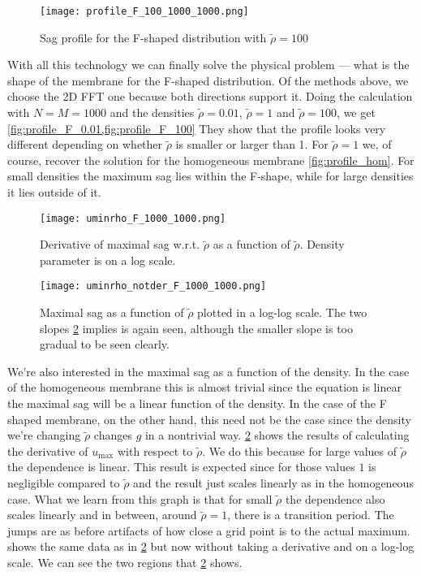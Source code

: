 \documentclass[10pt,a4paper,twocolumn]{article}
\begin{document}
\begin{figure}[!t]
    \centering
    \texttt{[image: profile\_F\_100\_1000\_1000.png]}
    \caption{Sag profile for the F-shaped distribution with $\tilde{\rho} = 100$}
    \label{fig:profile_F_100}
\end{figure}

With all this technology we can finally solve the physical problem --- what is the shape of the membrane for the F-shaped distribution. Of the methods above, we choose the 2D FFT one because both directions support it. Doing the calculation with $N = M = 1000$ and the densities $\tilde{\rho} = 0.01$, $\tilde{\rho} = 1$ and $\tilde{\rho} = 100$, we get \cref{fig:profile_F_0.01,fig:profile_F_100} They show that the profile looks very different depending on whether $\tilde{\rho}$ is smaller or larger than 1. For $\tilde{\rho} = 1$ we, of course, recover the solution for the homogeneous membrane \cref{fig:profile_hom}. For small densities the maximum sag lies within the F-shape, while for large densities it lies outside of it.

\begin{figure}[!h]
    \centering
    \texttt{[image: uminrho\_F\_1000\_1000.png]}
    \caption{Derivative of maximal sag w.r.t. $\tilde{\rho}$ as a function of $\tilde{\rho}$. Density parameter is on a log scale.}
    \label{fig:maxsagrho}
\end{figure}

\begin{figure}[!b]
    \centering
    \texttt{[image: uminrho\_notder\_F\_1000\_1000.png]}
    \caption{Maximal sag as a function of $\tilde{\rho}$ plotted in a log-log scale. The two slopes \cref{fig:maxsagrho} implies is again seen, although the smaller slope is too gradual to be seen clearly.}
    \label{fig:maxsagrho_notder}
\end{figure}

We're also interested in the maximal sag as a function of the density. In the case of the homogeneous membrane this is almost trivial since the equation is linear the maximal sag will be a linear function of the density. In the case of the F shaped membrane, on the other hand, this need not be the case since the density we're changing $\tilde{\rho}$ changes $g$ in a nontrivial way.
\cref{fig:maxsagrho} shows the results of calculating the derivative of $u_{\mathrm{max}}$ with respect to $\tilde{\rho}$. We do this because for large values of $\tilde{\rho}$ the dependence is linear. This result is expected since for those values $1$ is negligible compared to $\tilde{\rho}$ and the result just scales linearly as in the homogeneous case. What we learn from this graph is that for small $\tilde{\rho}$ the dependence also scales linearly and in between, around $\tilde{\rho} = 1$, there is a transition period. The jumps are as before artifacts of how close a grid point is to the actual maximum.  shows the same data as in \cref{fig:maxsagrho} but now without taking a derivative and on a log-log scale. We can see the two regions that \cref{fig:maxsagrho} shows.
\end{document}
